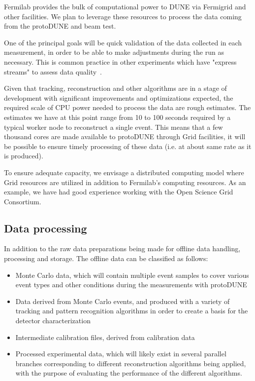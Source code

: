
Fermilab provides the bulk of computational power to DUNE via Fermigrid and other facilities. 
We plan to leverage these resources to process the data coming from the protoDUNE and beam test.

One of the principal goals will be quick validation of the data collected in each measurement, in
order to be able to make adjustments during the run as necessary. 
This is common practice in other experiments which have "express streams" to assess data quality~\cite{atlas_express}.


Given that tracking, reconstruction and other algorithms are in a stage of development with significant improvements
and optimizations expected, the required scale of CPU power needed to process the data are rough estimates.
The estimates we have at this point range from 10 to 100 seconds required by a typical worker node to reconstruct
a single event.  This means that a few thousand cores are made available to protoDUNE through Grid facilities, it will be
possible to ensure timely processing of these data (i.e. at about same rate as it is produced).

To ensure adequate capacity, we envisage a distributed computing model where Grid resources are
utilized in addition to Fermilab's computing resources. As an example, we have had good experience working
with the Open Science Grid Consortium.


\subsection{Data processing}
\label{sec:protodune-dataprocess}

In addition to the raw data preparations being made for offline data handling, processing and storage.
The offline data can be classified as follows:
\begin{itemize}
\item Monte Carlo data, which will contain multiple event samples to cover various event types and other conditions during the measurements
with protoDUNE

\item Data derived from Monte Carlo events, and produced with a variety of tracking and pattern recognition algorithms
in order to create a basis for the detector characterization

\item Intermediate calibration files, derived from calibration data

\item Processed experimental data, which will likely exist in several parallel branches corresponding to different reconstruction
algorithms being applied, with the purpose of evaluating the performance of the different algorithms.
\end{itemize}

